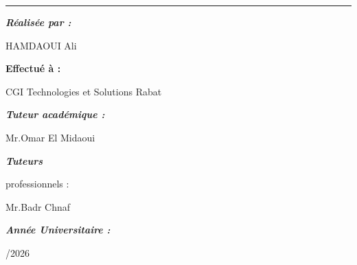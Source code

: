 \begin{titlepage}
\vspace{0.65cm}
\rule{0.82\textwidth}{0.4pt}

\vfill

{\fontsize{19}{23}\selectfont\bfseries\itshape Réalisée par :\par}
\vspace{0.25cm}
{\fontsize{18}{22}\selectfont HAMDAOUI Ali\par}

\vspace{0.35cm}

{\fontsize{18}{22}\selectfont\bfseries Effectué à :\par}
\vspace{0.25cm}
{\fontsize{18}{22}\selectfont CGI Technologies et Solutions Rabat\par}

\vfill

\noindent
\begin{minipage}[t]{0.48\textwidth}
  \centering
  {\fontsize{18}{22}\selectfont\bfseries\itshape Tuteur académique :\par}
  \vspace{0.55cm}
  {\fontsize{17}{21}\selectfont Mr.Omar El Midaoui\par}
\end{minipage}%
\hfill
\begin{minipage}[t]{0.42\textwidth}
  \centering
  {\fontsize{18}{22}\selectfont\bfseries\itshape Tuteurs\par professionnels :\par}
  \vspace{0.35cm}
  {\fontsize{17}{21}\selectfont Mr.Badr Chnaf\par}
\end{minipage}

\vspace{0.65cm}

{\fontsize{15}{18}\selectfont\bfseries\itshape Année Universitaire :\par}
\vspace{0.15cm}
{\fontsize{15}{18}/2026\par}

\restoregeometry
\end{titlepage}

